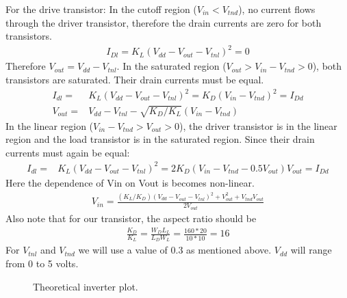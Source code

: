 \documentclass{article}
\begin{document}
For the drive transistor: In the cutoff region ($V_{in}<V_{tnd}$), no current flows through the driver transistor, therefore the drain currents are zero for both transistors.
\begin{align*}
I_{Dl} = K_L(V_{dd} - V_{out} - V_{tnl})^2 = 0
\end{align*}
Therefore $V_{out} = V_{dd} - V_{tnl}$. In the saturated region ($V_{out} >V_{in}-V_{tnd}>0$), both transistors are saturated. Their drain currents must be equal.
\begin{align*}
I_{dl} =& K_L(V_{dd} - V_{out} - V_{tnl})^2 = K_D(V_{in} - V_{tnd})^2 = I_{Dd} \\
V_{out} =& V_{dd} - V_{tnl} - \sqrt{K_D/K_L}(V_{in} - V_{tnd})
\end{align*}
In the linear region ($V_{in}-V_{tnd}>V_{out} >0$), the driver transistor is in the linear region and the load transistor is in the saturated region. Since their drain currents must again be equal:
\begin{align*}
I_{dl} =& K_L(V_{dd} - V_{out} - V_{tnl})^2 = 2K_D(V_{in} - V_{tnd} - 0.5V_{out})V_{out} = I_{Dd}
\end{align*}
Here the dependence of Vin on Vout is becomes non-linear. 
\begin{align*}
V_{in} = \frac{(K_L/K_D)(V_{dd} - V_{out} - V_{tnl})^2 + V_{out}^2 + V_{tnd}V_{out}}{2V_{out}}
\end{align*}
Also note that for our transistor, the aspect ratio should be
\begin{align*}
\frac{K_D}{K_L} = \frac{W_DL_L}{L_DW_L} = \frac{160*20}{10*10} = 16
\end{align*}
For $V_{tnl}$ and $V_{tnd}$ we will use a value of 0.3 as mentioned above. $V_{dd}$ will range from 0 to 5 volts.
\begin{figure}[H]
\centering
{}
\caption{Theoretical inverter plot.}
\end{figure}
\end{document}
